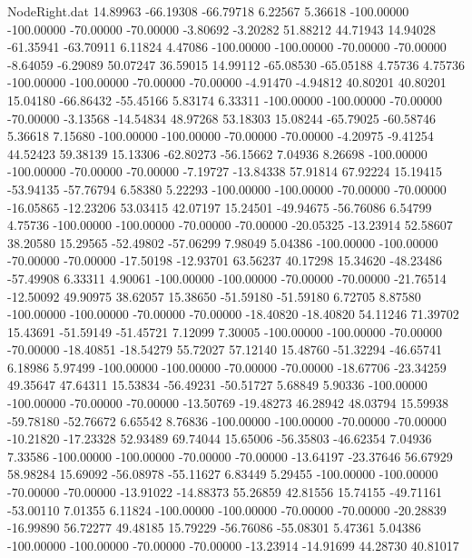 \begin{filecontents}{NodeRight.dat}
  14.89963  -66.19308  -66.79718     6.22567    5.36618 -100.00000 -100.00000  -70.00000  -70.00000   -3.80692   -3.20282   51.88212   44.71943
  14.94028  -61.35941  -63.70911     6.11824    4.47086 -100.00000 -100.00000  -70.00000  -70.00000   -8.64059   -6.29089   50.07247   36.59015
  14.99112  -65.08530  -65.05188     4.75736    4.75736 -100.00000 -100.00000  -70.00000  -70.00000   -4.91470   -4.94812   40.80201   40.80201
  15.04180  -66.86432  -55.45166     5.83174    6.33311 -100.00000 -100.00000  -70.00000  -70.00000   -3.13568  -14.54834   48.97268   53.18303
  15.08244  -65.79025  -60.58746     5.36618    7.15680 -100.00000 -100.00000  -70.00000  -70.00000   -4.20975   -9.41254   44.52423   59.38139
  15.13306  -62.80273  -56.15662     7.04936    8.26698 -100.00000 -100.00000  -70.00000  -70.00000   -7.19727  -13.84338   57.91814   67.92224
  15.19415  -53.94135  -57.76794     6.58380    5.22293 -100.00000 -100.00000  -70.00000  -70.00000  -16.05865  -12.23206   53.03415   42.07197
  15.24501  -49.94675  -56.76086     6.54799    4.75736 -100.00000 -100.00000  -70.00000  -70.00000  -20.05325  -13.23914   52.58607   38.20580
  15.29565  -52.49802  -57.06299     7.98049    5.04386 -100.00000 -100.00000  -70.00000  -70.00000  -17.50198  -12.93701   63.56237   40.17298
  15.34620  -48.23486  -57.49908     6.33311    4.90061 -100.00000 -100.00000  -70.00000  -70.00000  -21.76514  -12.50092   49.90975   38.62057
  15.38650  -51.59180  -51.59180     6.72705    8.87580 -100.00000 -100.00000  -70.00000  -70.00000  -18.40820  -18.40820   54.11246   71.39702
  15.43691  -51.59149  -51.45721     7.12099    7.30005 -100.00000 -100.00000  -70.00000  -70.00000  -18.40851  -18.54279   55.72027   57.12140
  15.48760  -51.32294  -46.65741     6.18986    5.97499 -100.00000 -100.00000  -70.00000  -70.00000  -18.67706  -23.34259   49.35647   47.64311
  15.53834  -56.49231  -50.51727     5.68849    5.90336 -100.00000 -100.00000  -70.00000  -70.00000  -13.50769  -19.48273   46.28942   48.03794
  15.59938  -59.78180  -52.76672     6.65542    8.76836 -100.00000 -100.00000  -70.00000  -70.00000  -10.21820  -17.23328   52.93489   69.74044
  15.65006  -56.35803  -46.62354     7.04936    7.33586 -100.00000 -100.00000  -70.00000  -70.00000  -13.64197  -23.37646   56.67929   58.98284
  15.69092  -56.08978  -55.11627     6.83449    5.29455 -100.00000 -100.00000  -70.00000  -70.00000  -13.91022  -14.88373   55.26859   42.81556
  15.74155  -49.71161  -53.00110     7.01355    6.11824 -100.00000 -100.00000  -70.00000  -70.00000  -20.28839  -16.99890   56.72277   49.48185
  15.79229  -56.76086  -55.08301     5.47361    5.04386 -100.00000 -100.00000  -70.00000  -70.00000  -13.23914  -14.91699   44.28730   40.81017

\end{filecontents}
